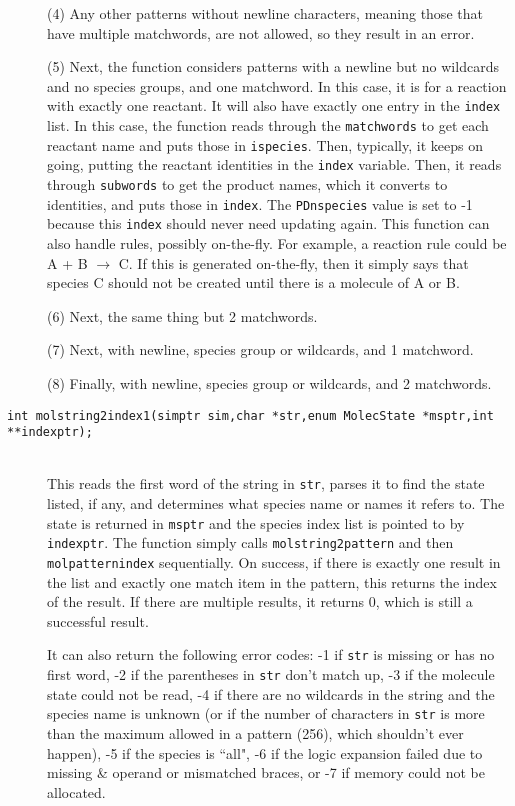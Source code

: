 \documentclass {book}
\begin{document}
\begin{description}
(4) Any other patterns without newline characters, meaning those that have multiple matchwords, are not allowed, so they result in an error.

(5) Next, the function considers patterns with a newline but no wildcards and no species groups, and one matchword.  In this case, it is for a reaction with exactly one reactant.  It will also have exactly one entry in the \texttt{index} list.  In this case, the function reads through the \texttt{matchwords} to get each reactant name and puts those in \texttt{ispecies}.  Then, typically, it keeps on going, putting the reactant identities in the \texttt{index} variable.  Then, it reads through \texttt{subwords} to get the product names, which it converts to identities, and puts those in \texttt{index}.  The \texttt{PDnspecies} value is set to -1 because this \texttt{index} should never need updating again.  This function can also handle rules, possibly on-the-fly.  For example, a reaction rule could be A + B $\rightarrow$ C.  If this is generated on-the-fly, then it simply says that species C should not be created until there is a molecule of A or B.

(6) Next, the same thing but 2 matchwords.

(7) Next, with newline, species group or wildcards, and 1 matchword.

(8) Finally, with newline, species group or wildcards, and 2 matchwords.

\item[\texttt{int molstring2index1(simptr sim,char *str,enum MolecState *msptr,int **indexptr);}]
\hfill \\
This reads the first word of the string in \texttt{str}, parses it to find the state listed, if any, and determines what species name or names it refers to.  The state is returned in \texttt{msptr} and the species index list is pointed to by \texttt{indexptr}.  The function simply calls \texttt{molstring2pattern} and then \texttt{molpatternindex} sequentially.  On success, if there is exactly one result in the list and exactly one match item in the pattern, this returns the index of the result.  If there are multiple results, it returns 0, which is still a successful result.

It can also return the following error codes: -1 if \texttt{str} is missing or has no first word, -2 if the parentheses in \texttt{str} don't match up, -3 if the molecule state could not be read, -4 if there are no wildcards in the string and the species name is unknown (or if the number of characters in \texttt{str} is more than the maximum allowed in a pattern (256), which shouldn't ever happen), -5 if the species is ``all", -6 if the logic expansion failed due to missing \& operand or mismatched braces, or -7 if memory could not be allocated.


\end{description}
\end{document}
